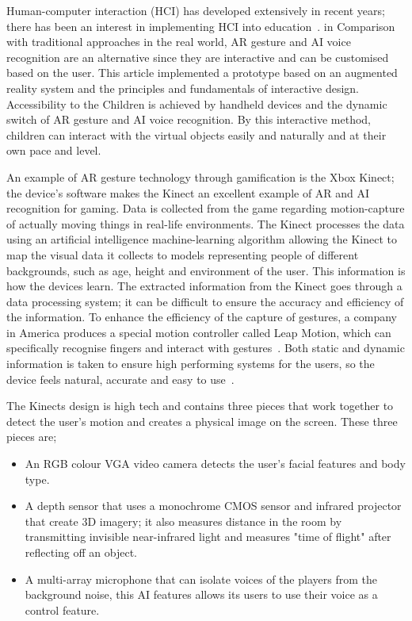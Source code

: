 Human-computer interaction (HCI) has developed extensively in recent years; there has been an interest in implementing HCI into education~\cite{Reference24}. in Comparison with traditional approaches in the real world, AR gesture and AI voice recognition are  an alternative since they are interactive and can be customised based on the user.  This article implemented a prototype based on an augmented reality system and the principles and fundamentals of interactive design. Accessibility to the Children is achieved by handheld devices and the dynamic switch of AR gesture and AI voice recognition. By this interactive method, children can interact with the virtual objects easily and naturally and at their own pace and level. 

An example of AR gesture technology through gamification is the Xbox Kinect; the device's software makes the Kinect an excellent example of AR and AI recognition for gaming. Data is collected from the game regarding motion-capture of actually moving things in real-life environments. The Kinect processes the data using an artificial intelligence machine-learning algorithm allowing the Kinect to map the visual data it collects to models representing people of different backgrounds, such as age, height and environment of the user. This information is how the devices learn. The extracted information from the Kinect goes through a data processing system; it can be difficult to ensure the accuracy and efficiency of the information. To enhance the efficiency of the capture of gestures, a company in America produces a special motion controller called  Leap  Motion,  which can specifically recognise fingers and interact with gestures~\cite{Reference25}. Both static and dynamic information is taken to ensure high performing systems for the users, so the device feels natural, accurate and easy to use~\cite{Reference26}.

The Kinects design is high tech and contains three pieces that work together to detect the user's motion and creates a physical image on the screen. These three pieces are;
\begin{itemize}
    \item An RGB colour VGA video camera detects the user's facial features and body type.
    \item A depth sensor that uses a monochrome CMOS sensor and infrared projector that create 3D imagery; it also measures distance in the room by transmitting invisible near-infrared light and measures "time of flight" after reflecting off an object. 
    \item A multi-array microphone that can isolate voices of the players from the background noise, this AI features allows its users to use their voice as a control feature.
\end{itemize}

